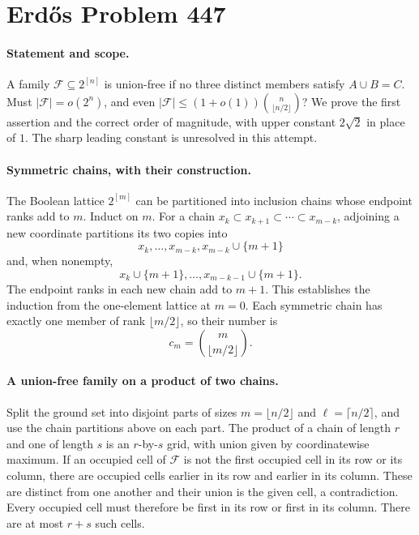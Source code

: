 \section*{Erd\H{o}s Problem 447}

\paragraph{Statement and scope.}
A family \(\mathcal F\subseteq2^{[n]}\) is union-free if no three
distinct members satisfy \(A\cup B=C\). Must
\(|\mathcal F|=o(2^n)\), and even
\(|\mathcal F|\leq(1+o(1))\binom n{\lfloor n/2\rfloor}\)?
We prove the first assertion and the correct order of magnitude, with
upper constant \(2\sqrt2\) in place of \(1\). The sharp leading
constant is unresolved in this attempt.

\paragraph{Symmetric chains, with their construction.}
The Boolean lattice \(2^{[m]}\) can be partitioned into inclusion chains
whose endpoint ranks add to \(m\). Induct on \(m\).
For a chain \(x_k\subset x_{k+1}\subset\cdots\subset x_{m-k}\),
adjoining a new coordinate partitions its two copies into
\[
 x_k,\ldots,x_{m-k},x_{m-k}\cup\{m+1\}
\]
and, when nonempty,
\[
 x_k\cup\{m+1\},\ldots,x_{m-k-1}\cup\{m+1\}.
\]
The endpoint ranks in each new chain add to \(m+1\).
This establishes the induction from the one-element lattice at \(m=0\).
Each symmetric chain has exactly one member of rank \(\lfloor m/2\rfloor\),
so their number is
\[
 c_m=\binom m{\lfloor m/2\rfloor}.
 \tag{1}
\]

\paragraph{A union-free family on a product of two chains.}
Split the ground set into disjoint parts of sizes
\(m=\lfloor n/2\rfloor\) and \(\ell=\lceil n/2\rceil\), and use the
chain partitions above on each part.
The product of a chain of length \(r\) and one of length \(s\)
is an \(r\)-by-\(s\) grid, with union given by coordinatewise maximum.
If an occupied cell of \(\mathcal F\) is not the first occupied cell
in its row or its column, there are occupied cells earlier in its row
and earlier in its column. These are distinct from one another and
their union is the given cell, a contradiction.
Every occupied cell must therefore be first in its row or first in
its column. There are at most \(r+s\) such cells.

